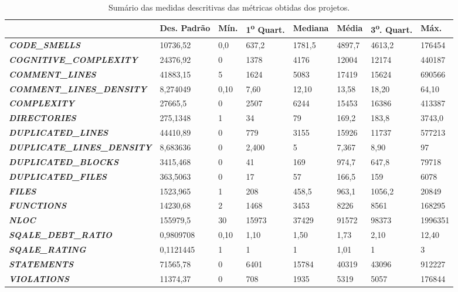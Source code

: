 \begin{table}[H]
\scriptsize                 
\def\arraystretch{1.3}%
\centering
\begin{tabular}{|l|l|l|l|l|l|l|l|}
\hline
 &\textbf{Des. Padrão} & \textbf{Mín.}      & \textbf{1\textsuperscript{o} Quart.}  & \textbf{Mediana} & \textbf{Média}    & \textbf{3\textsuperscript{o}. Quart.}    & \textbf{Máx.}              \\ \hline
\textit{\textbf{CODE\_SMELLS }} & 10736,52     &0,0  &  637,2  & 1781,5 &  4897,7 &  4613,2 & 176454     \\ \hline
\textit{\textbf{COGNITIVE\_COMPLEXITY }} & 24376,92 & 0   & 1378    & 4176 & 12004 & 12174 & 440187  \\ \hline
\textit{\textbf{COMMENT\_LINES }} & 41883,15   & 5    & 1624      & 5083   &  17419   &  15624   & 690566     \\ \hline
\textit{\textbf{COMMENT\_LINES\_DENSITY}} & 8,274049    & 0,10  &  7,60    & 12,10     & 13,58    & 18,20    & 64,10  \\ \hline
\textit{\textbf{COMPLEXITY  }}   & 27665,5  & 0 & 2507  & 6244   & 15453  & 16386  & 413387 \\ \hline
\textit{\textbf{DIRECTORIES}} & 275,1348    & 1    & 34   & 79     & 169,2   & 183,8     & 3743,0    \\ \hline
\textit{\textbf{DUPLICATED\_LINES}}   & 44410,89    & 0 & 779  & 3155    & 15926     & 11737    & 577213      \\ \hline
\textit{\textbf{DUPLICATE\_LINES\_DENSITY}}   & 8,683636   & 0  & 2,400    & 5    & 7,367    & 8,90   & 97  \\ \hline
\textit{\textbf{DUPLICATED\_BLOCKS}}   & 3415,468   & 0  & 41   & 169    &   974,7  & 647,8    & 79718   \\ \hline
\textit{\textbf{DUPLICATED\_FILES  }}   & 363,5063    & 0  & 17    & 57     & 166,5    & 159    &  6078 \\ \hline
\textit{\textbf{FILES }}   & 1523,965    & 1  & 208    & 458,5     & 963,1   & 1056,2   & 20849  \\ \hline
\textit{\textbf{FUNCTIONS}}   & 14230,68    & 2  & 1468    & 3453     & 8226    & 8561    & 168295  \\ \hline
\textit{\textbf{NLOC}}   & 155979,5    & 30  & 15973   & 37429     & 91572    & 98373    & 1996351  \\ \hline
\textit{\textbf{SQALE\_DEBT\_RATIO}}   & 0,9809708    & 0,10  &  1,10    & 1,50    & 1,73    & 2,10    & 12,40   \\ \hline
\textit{\textbf{SQALE\_RATING}}   & 0,1121445    & 1  & 1    & 1     & 1,01   & 1    & 3  \\ \hline
\textit{\textbf{STATEMENTS }}   & 71565,78    &0  & 6401    & 15784     & 40319    & 43096    & 912227  \\ \hline
\textit{\textbf{VIOLATIONS }}   & 11374,37    & 0  & 708    & 1935   & 5319    & 5057    & 176844  \\ \hline

\end{tabular}
\caption{Sumário das medidas descritivas das métricas obtidas dos projetos.}
\end{table}
\label{tabela_sumario_metricas}


